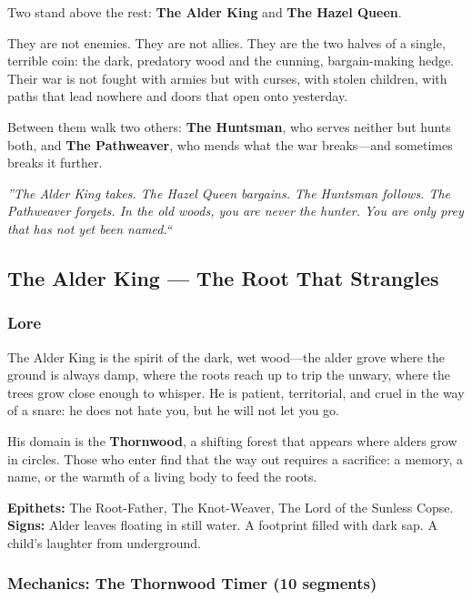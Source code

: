 \documentclass[11pt]{article}
\begin{document}
Two stand above the rest: \textbf{The Alder King} and \textbf{The Hazel Queen}.

They are not enemies. They are not allies. They are the two halves of a single, terrible coin: the dark, predatory wood and the cunning, bargain-making hedge. Their war is not fought with armies but with curses, with stolen children, with paths that lead nowhere and doors that open onto yesterday.

Between them walk two others: \textbf{The Huntsman}, who serves neither but hunts both, and \textbf{The Pathweaver}, who mends what the war breaks---and sometimes breaks it further.

\begin{mdframed}[backgroundcolor=horrorbg, linecolor=bloodcolor]
\centering
\textit{''The Alder King takes. The Hazel Queen bargains. The Huntsman follows. The Pathweaver forgets. In the old woods, you are never the hunter. You are only prey that has not yet been named.``}
\end{mdframed}

\subsection{The Alder King --- The Root That Strangles}

\subsubsection{Lore}

The Alder King is the spirit of the dark, wet wood---the alder grove where the ground is always damp, where the roots reach up to trip the unwary, where the trees grow close enough to whisper. He is patient, territorial, and cruel in the way of a snare: he does not hate you, but he will not let you go.

His domain is the \textbf{Thornwood}, a shifting forest that appears where alders grow in circles. Those who enter find that the way out requires a sacrifice: a memory, a name, or the warmth of a living body to feed the roots.

\textbf{Epithets:} The Root-Father, The Knot-Weaver, The Lord of the Sunless Copse.
\textbf{Signs:} Alder leaves floating in still water. A footprint filled with dark sap. A child's laughter from underground.

\subsubsection{Mechanics: The Thornwood Timer (10 segments)}
\end{document}
